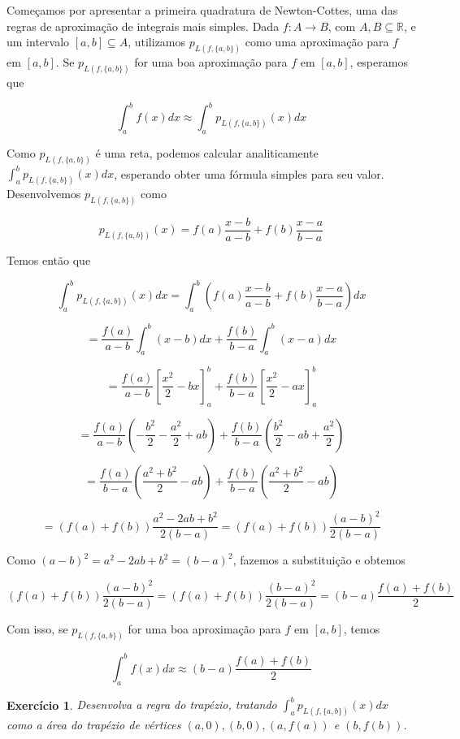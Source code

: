 \documentclass[]{article}
\newtheorem{exercicio}{Exercício}
\numberwithin{equation}{section}
\begin{document}
Começamos por apresentar a primeira quadratura de Newton-Cottes, uma das regras de aproximação de integrais mais simples. Dada $f : A \to B$, com $A, B \subseteq \mathbb{R}$, e um intervalo $[a, b] \subseteq A$, utilizamos $p_{L(f, \{a, b\})}$ como uma aproximação para $f$ em $[a, b]$. Se $p_{L(f, \{a, b\})}$ for uma boa aproximação para $f$ em $[a, b]$, esperamos que

$$
\int_{a}^{b} f(x) dx \approx \int_{a}^{b} p_{L(f, \{a, b\})}(x) dx
$$

Como $p_{L(f, \{a, b\})}$ é uma reta, podemos calcular analiticamente $\int_{a}^{b} p_{L(f, \{a, b\})}(x) dx$, esperando obter uma fórmula simples para seu valor. Desenvolvemos $p_{L(f, \{a, b\})}$ como

$$
p_{L(f, \{a, b\})}(x) = f(a) \frac{x - b}{a - b} + f(b) \frac{x - a}{b - a}
$$

Temos então que

$$
\int_{a}^{b} p_{L(f, \{a, b\})}(x) dx = \int_{a}^{b} \left(f(a) \frac{x - b}{a - b} + f(b) \frac{x - a}{b - a}\right) dx
$$

$$
= \frac{f(a)}{a - b} \int_{a}^{b} (x - b) dx + \frac{f(b)}{b - a} \int_{a}^{b} (x - a) dx
$$

$$
= \frac{f(a)}{a - b} \left[\frac{x^2}{2} - bx\right]_a^b + \frac{f(b)}{b - a} \left[\frac{x^2}{2} - ax\right]_a^b
$$

$$
= \frac{f(a)}{a - b} \left(-\frac{b^2}{2} - \frac{a^2}{2} + ab\right) + \frac{f(b)}{b - a} \left(\frac{b^2}{2} - ab + \frac{a^2}{2}\right)
$$

$$
= \frac{f(a)}{b - a} \left(\frac{a^2 + b^2}{2} - ab\right) + \frac{f(b)}{b - a} \left(\frac{a^2 + b^2}{2} - ab\right)
$$

$$
= (f(a) + f(b)) \frac{a^2 - 2ab + b^2}{2(b - a)} = (f(a) + f(b)) \frac{(a - b)^2}{2(b - a)}
$$

Como $(a - b)^2 = a^2 - 2ab + b^2 = (b - a)^2$, fazemos a substituição e obtemos

$$
(f(a) + f(b)) \frac{(a - b)^2}{2(b - a)} = (f(a) + f(b)) \frac{(b - a)^2}{2(b - a)} = (b - a) \frac{f(a) + f(b)}{2}
$$

Com isso, se $p_{L(f, \{a, b\})}$ for uma boa aproximação para $f$ em $[a, b]$, temos

$$
\int_{a}^{b} f(x) dx \approx (b - a) \frac{f(a) + f(b)}{2}
$$

\begin{exercicio}
	Desenvolva a regra do trapézio, tratando $\int_{a}^{b} p_{L(f, \{a, b\})}(x) dx$ como a área do trapézio de vértices $(a, 0), (b, 0), (a, f(a))$ e $(b, f(b))$.
\end{exercicio}
\end{document}
